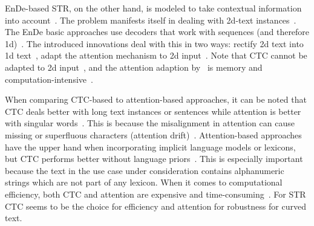 \ac{EnDe}-based \ac{STR}, on the other hand, is modeled to take contextual information into
account~\citep{long_scene_2021,chen_text_2021}.
The problem manifests itself in dealing with 2d-text
instances~\citep{long_scene_2021,liao_scene_2018}.
The \ac{EnDe} basic approaches use decoders that work with sequences (and therefore
1d)~\citep{long_scene_2021,cheng_aon_2018}.
The introduced innovations deal with this in two ways: rectify 2d text into 1d
text~\citep{zhan_esir_2019,luo_multi-object_2019,shi_aster_2019,liu_char-net_2018}, adapt the
attention mechanism to 2d input~\citep{li_show_2019}.
Note that \ac{CTC} cannot be adapted to 2d input~\citep{cheng_focusing_2017,xie_aggregation_2019},
and the attention adaption by~\cite{li_show_2019} is memory and
computation-intensive~\citep{xie_aggregation_2019}.

When comparing \ac{CTC}-based to attention-based approaches, it can be noted that \ac{CTC} deals
better with long text instances or sentences while attention is better with singular
words~\citep{cong_comparative_2019,chen_text_2021}.
This is because the misalignment in attention can cause missing or superfluous characters (attention
drift)~\citep{bai_edit_2018,liao_scene_2018,cheng_focusing_2017}.
Attention-based approaches have the upper hand when incorporating implicit language models
or lexicons, but \ac{CTC} performs better without language priors~\citep{cong_comparative_2019}.
This is especially important because the text in the use case under consideration contains
alphanumeric strings which are not part of any lexicon.
When it comes to computational efficiency, both \ac{CTC} and attention are expensive and
time-consuming~\citep{chen_text_2021}.
For \ac{STR} \ac{CTC} seems to be the choice for efficiency and attention for robustness for
curved text.

